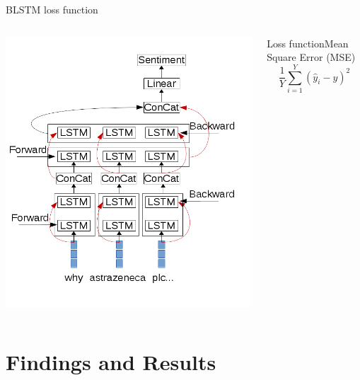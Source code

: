 \documentclass[10pt]{beamer}
\begin{document}
\begin{frame}[fragile]{BLSTM loss function}
\begin{columns}[T,onlytextwidth]
\includegraphics[scale=0.3]{lstm_diagram.png}

\centering
\begin{block}{Loss function\newline Mean Square Error (MSE)}
\begin{equation}
\frac{1}{Y}\sum\limits_{i=1}^{Y} (\hat y_i - y)^2
\end{equation}

\end{block}
\end{columns}
\end{frame}




\section{Findings and Results}
\end{document}
